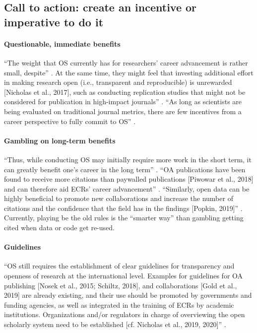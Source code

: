 \subsection{Call to action: create an incentive or imperative to do it}

\paragraph{Questionable, immediate benefits}
%
``The weight that OS currently has for researchers’ career advancement is rather
small, despite'' \citep{toribio2021early}.
%
At the same time, they might feel that investing additional effort in making
research open (i.e., transparent and reproducible) is unrewarded [Nicholas et
al., 2017], such as conducting replication studies that might not be considered
for publication in high-impact journals'' \citep{toribio2021early}.
%
``As long as scientists are being evaluated on traditional journal metrics,
there are few incentives from a career perspective to fully commit to OS''
\citep{toribio2021early}.


\paragraph{Gambling on long-term benefits}

%
``Thus, while conducting OS may initially require more work in the short term,
it can greatly benefit one’s career in the long term'' \citep{toribio2021early}.
%
``OA publications have been found to receive more citations than paywalled
publications [Piwowar et al., 2018] and can therefore aid ECRs’ career
advancement'' \citep{toribio2021early}.
%
``Similarly, open data can be highly beneficial to promote new collaborations
and increase the number of citations and the confidence that the field has in
the findings [Popkin, 2019]'' \citep{toribio2021early}.
%
Currently, playing be the old rules is the ``smarter way'' than gambling getting
cited when data or code get re-used.


\paragraph{Guidelines}
%
``OS still requires the establishment of clear guidelines for transparency and
openness of research at the international level.
%
Examples for guidelines for OA publishing [Nosek et al., 2015; Schiltz, 2018],
and collaborations [Gold et al., 2019] are already existing, and their use
should be promoted by governments and funding agencies, as well as integrated in
the training of ECRs by academic institutions.
%
Organizations and/or regulators in charge of overviewing the open scholarly
system need to be established [cf. Nicholas et al., 2019, 2020]''
\citep{toribio2021early}.


